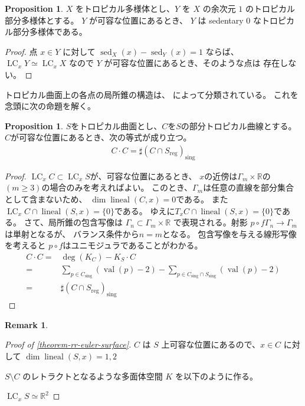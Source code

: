 \documentclass[a4paper,dvipdfmx,reqno,12pt]{amsart}
\theoremstyle{definition}
\newtheorem{proposition}[theorem]{Proposition}
\newtheorem{remark}[theorem]{Remark}
\newcommand{\opn}[1]{\operatorname{#1}}
\numberwithin{equation}{section}
\begin{document}
\begin{proposition}
$X$ をトロピカル多様体とし、$Y$ を
$X$ の余次元 $1$
のトロピカル部分多様体とする。
$Y$ が可容な位置にあるとき、
$Y$ は sedentary 0 なトロピカル部分多様体である。
\end{proposition}
\begin{proof}
点 $x\in Y$ に対して
$\opn{sed}_X(x)-\opn{sed}_Y(x)=1$ ならば、
$\opn{LC}_xY\simeq \opn{LC}_x X$ なので
$Y$ が可容な位置にあるとき、そのような点は
存在しない。
\end{proof}

トロピカル曲面上の各点の局所錐の構造は、
\cite[Corollary 2.4]{shaw2015tropical}
によって分類されている。
これを念頭に次の命題を解く。
\begin{proposition}
$S$をトロピカル曲面とし、$C$を$S$の部分トロピカル曲線とする。
$C$が可容な位置にあるとき、次の等式が成り立つ。
\begin{align}
     C\cdot C=\sharp (C\cap S_{\mathrm{reg}})_{\mathrm{sing}}
\end{align}
\end{proposition}
\begin{proof}
$\opn{LC}_x C\subset \opn{LC}_x S$が、可容な位置にあるとき、
$x$の近傍は$\Gamma_m\times \mathbb{R}$の
$(m\geq 3)$の場合のみを考えればよい。
このとき、$\Gamma_m$は任意の直線を部分集合として含まないため、
$\dim \opn{lineal}(C,x)=0$である。
また$\opn{LC}_x C\cap \opn{lineal}(S,x)=\{0\}$である。
ゆえに$T_x C\cap \opn{lineal}(S,x)=\{0\}$である。
さて、局所錐の包含写像は
$\Gamma_{n}\subset \Gamma_m\times \mathbb{R}$
で表現される。射影 $p\circ f\Gamma_n\to \Gamma_m$は単射となるが、
バランス条件から$n=m$となる。
包含写像を与える線形写像を考えると
$p\circ f$はユニモジュラであることがわかる。
\begin{align}
C\cdot C=&\opn{deg}(K_C)-K_S\cdot C \\
=& \sum_{p\in C_{\mathrm{sing}}}(\opn{val}(p)-2)
- \sum_{p\in C_{\mathrm{sing}}\cap S_{\mathrm{sing}}}
(\opn{val}(p)-2) \\
=& \sharp (C\cap S_{\mathrm{reg}})_{\mathrm{sing}}
\end{align}

\end{proof}

\begin{remark}
     
\end{remark}

\begin{proof}[{Proof of \cref{theorem-rr-euler-surface}}]

$C$ は $S$ 上可容な位置にあるので、$x\in C$
に対して $\dim \opn{lineal}(S,x)=1,2$

$S\setminus C$ のレトラクトとなるような多面体空間
$K$ を以下のように作る。


$\opn{LC}_x S\simeq \mathbb{R}^{2}$

\end{proof}
\end{document}
